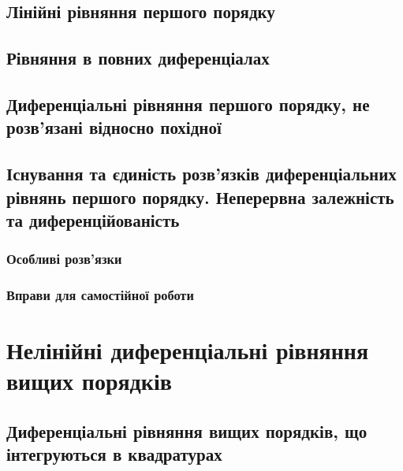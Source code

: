 \documentclass[a4paper, 12pt]{article}
\theoremstyle{definition}
\numberwithin{equation}{section}%
\numberwithin{equation}{subsection}
\begin{document}


\subsection{Лінійні рівняння першого порядку}



\subsection{Рівняння в повних диференціалах}



\subsection{Диференціальні рівняння першого порядку, не розв’язані відносно похідної}



\subsection{Існування та єдиність розв’язків диференціальних рівнянь першого порядку. Неперервна залежність та диференційованість}



\subsubsection{Особливі розв’язки}



\subsubsection{Вправи для самостійної роботи}



\section{Нелінійні диференціальні рівняння вищих порядків}



\subsection{Диференціальні рівняння вищих порядків, що інтегруються в квадратурах}
\end{document}
